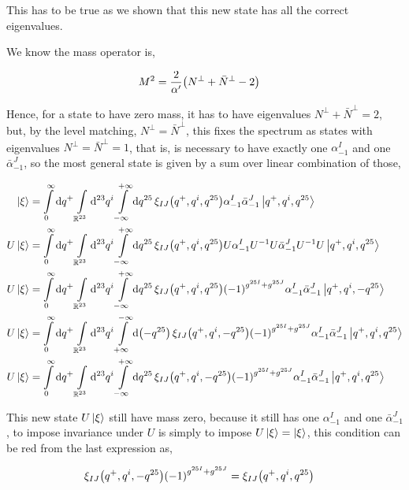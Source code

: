 This has to be true as we shown that this new state has all the correct eigenvalues.

We know the mass operator is,

\begin{align*}
    M^2&=\frac{2}{\alpha'}\qty(N^\perp+{\bar N}^\perp-2)
\end{align*}

Hence, for a state to have zero mass, it has to have eigenvalues $N^\perp+{\bar N}^\perp=2$, but, by the level matching, $N^\perp={\bar N}^\perp$, 
this fixes the spectrum as states with eigenvalues $N^\perp={\bar N}^\perp=1$, that is, is necessary to have exactly one $\alpha^I_{-1}$ and one 
${\bar \alpha}_{-1}^J$, so the most general state is given by a sum over linear combination of those,

\begin{align*}
    \ket{\xi}&=\int\limits_0^\infty\dd{q^+}\int\limits_{\mathbb R^{23}}\dd[23]{q^i}\int\limits_{-\infty}^{+\infty}\dd{q^{25}}\xi_{IJ}\qty(q^+,q^i,q^{25})\alpha^I_{-1}{\bar\alpha}^J_{-1}\ket{q^+,q^i,q^{25}}\\
    U\ket{\xi}&=\int\limits_0^\infty\dd{q^+}\int\limits_{\mathbb R^{23}}\dd[23]{q^i}\int\limits_{-\infty}^{+\infty}\dd{q^{25}}\xi_{IJ}\qty(q^+,q^i,q^{25})U\alpha^I_{-1}U^{-1}U{\bar\alpha}^J_{-1}U^{-1}U\ket{q^+,q^i,q^{25}}\\
    U\ket{\xi}&=\int\limits_0^\infty\dd{q^+}\int\limits_{\mathbb R^{23}}\dd[23]{q^i}\int\limits_{-\infty}^{+\infty}\dd{q^{25}}\xi_{IJ}\qty(q^+,q^i,q^{25})\qty(-1)^{g^{25I}+g^{25J}}\alpha^I_{-1}{\bar\alpha}^J_{-1}\ket{q^+,q^i,-q^{25}}\\
    U\ket{\xi}&=\int\limits_0^\infty\dd{q^+}\int\limits_{\mathbb R^{23}}\dd[23]{q^i}\int\limits_{+\infty}^{-\infty}\dd{\qty(-q^{25})}\xi_{IJ}\qty(q^+,q^i,-q^{25})\qty(-1)^{g^{25I}+g^{25J}}\alpha^I_{-1}{\bar\alpha}^J_{-1}\ket{q^+,q^i,q^{25}}\\
    U\ket{\xi}&=\int\limits_0^\infty\dd{q^+}\int\limits_{\mathbb R^{23}}\dd[23]{q^i}\int\limits_{-\infty}^{+\infty}\dd{q^{25}}\xi_{IJ}\qty(q^+,q^i,-q^{25})\qty(-1)^{g^{25I}+g^{25J}}\alpha^I_{-1}{\bar\alpha}^J_{-1}\ket{q^+,q^i,q^{25}}
\end{align*}

This new state $U\ket\xi$ still have mass zero, because it still has one $\alpha^I_{-1}$ and one ${\bar\alpha}^J_{-1}$, to impose invariance under $U$ 
is simply to impose $U\ket\xi=\ket\xi$, this condition can be red from the last expression as,

\begin{align*}
    \xi_{IJ}\qty(q^+,q^i,-q^{25})\qty(-1)^{g^{25I}+g^{25J}}&=\xi_{IJ}\qty(q^+,q^i,q^{25})
\end{align*}

